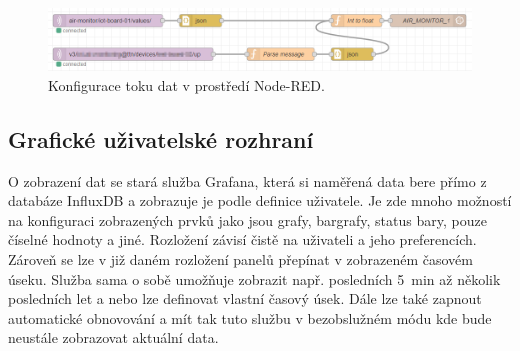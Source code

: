 \begin{figure}
    \centering
    \includegraphics[width=\textwidth]{obrazky/nodered.png}
    \caption{Konfigurace toku dat v prostředí Node-RED.}
    \label{fig_NodeRED}
\end{figure}

\subsection{Grafické uživatelské rozhraní}

O zobrazení dat se stará služba Grafana, která si naměřená data bere přímo z databáze InfluxDB a zobrazuje je podle definice uživatele. Je zde mnoho možností na konfiguraci zobrazených prvků jako jsou grafy, bargrafy, status bary, pouze číselné hodnoty a jiné. Rozložení závisí čistě na uživateli a jeho preferencích. Zároveň se lze v již daném rozložení panelů přepínat v zobrazeném časovém úseku. Služba sama o sobě umožňuje zobrazit např. posledních \SI{5}{\minute} až několik posledních let a nebo lze definovat vlastní časový úsek. Dále lze také zapnout automatické obnovování a mít tak tuto službu v bezobslužném módu kde bude neustále zobrazovat aktuální data.


